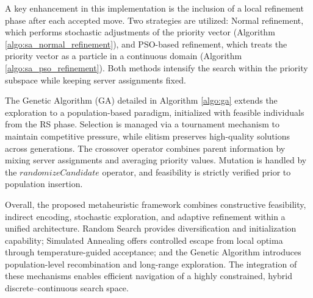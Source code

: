\documentclass[11pt,a4paper]{article}
\begin{document}


A key enhancement in this implementation is the inclusion of a local refinement phase after each accepted move. Two strategies are utilized: Normal refinement, which performs stochastic adjustments of the priority vector (Algorithm \ref{algo:sa_normal_refinement}), and PSO-based refinement, which treats the priority vector as a particle in a continuous domain (Algorithm \ref{algo:sa_pso_refinement}). Both methods intensify the search within the priority subspace while keeping server assignments fixed.



The Genetic Algorithm (GA) detailed in Algorithm \ref{algo:ga} extends the exploration to a population-based paradigm, initialized with feasible individuals from the RS phase. Selection is managed via a tournament mechanism to maintain competitive pressure, while elitism preserves high-quality solutions across generations. The crossover operator combines parent information by mixing server assignments and averaging priority values. Mutation is handled by the $randomizeCandidate$ operator, and feasibility is strictly verified prior to population insertion.



Overall, the proposed metaheuristic framework combines constructive feasibility, indirect encoding, stochastic exploration, and adaptive refinement within a unified architecture. Random Search provides diversification and initialization capability; Simulated Annealing offers controlled escape from local optima through temperature-guided acceptance; and the Genetic Algorithm introduces population-level recombination and long-range exploration. The integration of these mechanisms enables efficient navigation of a highly constrained, hybrid discrete–continuous search space.
\end{document}

